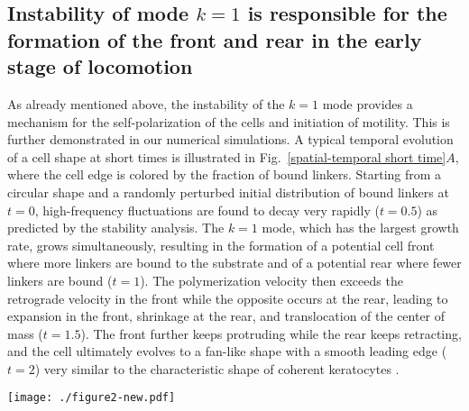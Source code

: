 \documentclass[12pt]{article}
\begin{document}
        \subsection*{Instability of mode $k=1$ is responsible for the formation of the front and rear in the early stage of locomotion}
        As already mentioned above, the instability of the $k=1$ mode provides a mechanism for the self-polarization of the cells and initiation of motility. 
        This is further demonstrated in our numerical simulations. 
        A typical temporal evolution of a cell shape at short times is illustrated in Fig.~\ref{spatial-temporal short time}$A$, where the cell edge is colored by the fraction of bound linkers. 
        Starting from a circular shape and a randomly perturbed initial distribution of bound linkers at $t=0$, high-frequency fluctuations are found to decay very rapidly ($t=0.5$) as predicted by the stability analysis. 
        The $k=1$ mode, which has the largest growth rate, grows simultaneously, resulting in the formation of a potential cell front where more linkers are bound to the substrate and of a potential rear where fewer linkers are bound ($t=1$). 
        The polymerization velocity then exceeds the retrograde velocity in the front while the opposite occurs at the rear, leading to expansion in the front, shrinkage at the rear, and translocation of the center of mass ($t=1.5$). 
        The front further keeps protruding while the rear keeps retracting, and
        the cell ultimately evolves to a fan-like shape with a smooth leading edge ($t=2$) very similar to the characteristic shape of coherent keratocytes \cite{barnhart2010bipedal}. 

        \begin{figure*}[t]
                \centering
                \texttt{[image: ./figure2-new.pdf]}
                \caption{Spatiotemporal evolution of a fan-shaped cell during the initiation of motion ($t=0$ to $t=2$) from a nonlinear numerical simulation. (\textit{A}) Time evolution of the cell shape, where the edge is colored by the fraction of bound linkers. The two black dots show the initial and current center-of-mass positions. (\textit{B})-(\textit{E}) Kymographs of the fraction of bound linkers $n$,  off-rate $r$,  total friction $r\log r + \zeta_1 n\log r$, and  local curvature $\kappa$, as functions of normalized arclength $s/L$ and time $t$. Parameters values: $\epsilon = 0.001,\;h = 0.01,\;k_\sigma = 1000,\;\sigma_c = 100,\; r_p = 50,\;r_\text{on}=25,\;\zeta = 600,\;D=0.05$. }
                \label{spatial-temporal short time}
            \end{figure*}
        
\end{document}
